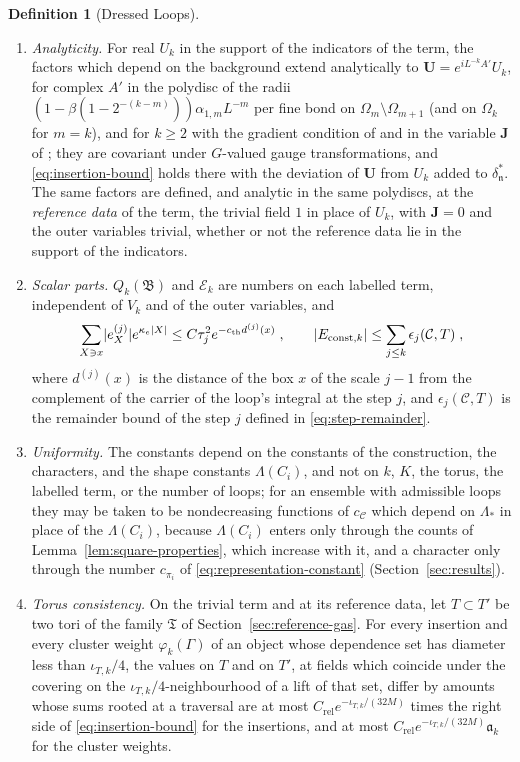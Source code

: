 \documentclass[11pt]{preprint}
\DeclarePairedDelimiter{\abs}{\lvert}{\rvert}
\numberwithin{equation}{section}
\theoremstyle{definition}
\newtheorem{definition}[theorem]{Definition}
\theoremstyle{remark}
\theoremstyle{plain}
\begin{document}
\begin{definition}[Dressed Loops]
\begin{enumerate}[label=(\roman*)]
\item \emph{Analyticity.} For real $U_k$ in the support of the indicators of the term, the factors which depend on the background extend analytically to $\mathbf U = e^{iL^{-k}A'}U_k$, for complex $A'$ in the polydisc of the radii $(1 - \beta(1 - 2^{-(k-m)}))\alpha_{1,m}L^{-m}$ per fine bond on $\Omega_m \setminus \Omega_{m+1}$ (and on $\Omega_k$ for $m = k$), and for $k \geq 2$ with the gradient condition of \cite[(2.39), p.~261]{BalabanCRE} and in the variable $\mathbf J$ of \cite[(2.36)]{BalabanCRE}; they are covariant under $G$-valued gauge transformations, and \eqref{eq:insertion-bound} holds there with the deviation of $\mathbf U$ from $U_k$ added to $\delta^{*}_{\mathfrak n}$. The same factors are defined, and analytic in the same polydiscs, at the \emph{reference data} of the term, the trivial field $1$ in place of $U_k$, with $\mathbf J = 0$ and the outer variables trivial, whether or not the reference data lie in the support of the indicators.
\item \emph{Scalar parts.} $Q_k(\mathfrak B)$ and $\mathcal E_k$ are numbers on each labelled term, independent of $V_k$ and of the outer variables, and
\begin{equation}\label{eq:scalar-bounds}
    \sum_{X \ni x}\abs{e^{(j)}_X}e^{\kappa_e\abs{X}} \leq C\tau_j^2e^{-c_{\mathrm{th}}d^{(j)}(x)}\;,
    \qquad
    \abs{E_{\mathrm{const},k}} \leq \sum_{j \leq k}\epsilon_j(\mathcal C, T)\;,
\end{equation}
where $d^{(j)}(x)$ is the distance of the box $x$ of the scale $j - 1$ from the complement of the carrier of the loop's integral at the step $j$, and $\epsilon_j(\mathcal C, T)$ is the remainder bound of the step $j$ defined in \eqref{eq:step-remainder}.
\item \emph{Uniformity.} The constants depend on the constants of the construction, the characters, and the shape constants $\Lambda(C_i)$, and not on $k$, $K$, the torus, the labelled term, or the number of loops; for an ensemble with admissible loops they may be taken to be nondecreasing functions of $c_{\mathcal C}$ which depend on $\Lambda_*$ in place of the $\Lambda(C_i)$, because $\Lambda(C_i)$ enters only through the counts of Lemma~\ref{lem:square-properties}, which increase with it, and a character only through the number $c_{\pi_i}$ of \eqref{eq:representation-constant} (Section~\ref{sec:results}).
\item \emph{Torus consistency.} On the trivial term and at its reference data, let $T \subset T'$ be two tori of the family $\mathfrak T$ of Section~\ref{sec:reference-gas}. For every insertion and every cluster weight $\varphi_k(\Gamma)$ of an object whose dependence set has diameter less than $\iota_{T,k}/4$, the values on $T$ and on $T'$, at fields which coincide under the covering on the $\iota_{T,k}/4$-neighbourhood of a lift of that set, differ by amounts whose sums rooted at a traversal are at most $C_{\mathrm{rel}}e^{-\iota_{T,k}/(32M)}$ times the right side of \eqref{eq:insertion-bound} for the insertions, and at most $C_{\mathrm{rel}}e^{-\iota_{T,k}/(32M)}\mathfrak a_k$ for the cluster weights.

\end{enumerate}
\end{definition}
\end{document}
